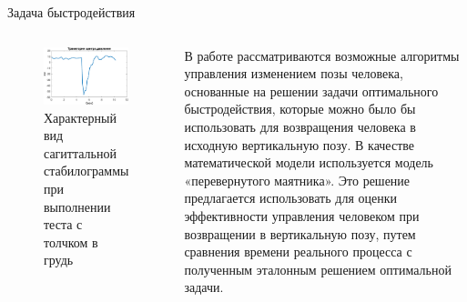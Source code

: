 \documentclass[10pt]{beamer}
\begin{document}
\begin{frame}{Задача быстродействия}
	\begin{columns}
		\begin{figure}[h!]
			\includegraphics[width=1.1\linewidth]{images/center_of_pressure.eps}
			\caption{Характерный вид сагиттальной стабилограммы при выполнении теста с толчком в грудь}
		\end{figure}
		В работе рассматриваются возможные алгоритмы управления изменением
		позы человека, основанные на решении задачи оптимального быстродействия,
		которые можно было бы использовать для возвращения человека в исходную
		вертикальную позу. В качестве математической модели используется модель
		«перевернутого маятника». Это решение предлагается использовать для
		оценки эффективности управления человеком при возвращении в
		вертикальную позу, путем сравнения времени реального процесса с полученным
		эталонным решением оптимальной задачи.
	\end{columns}
\end{frame}
\end{document}
